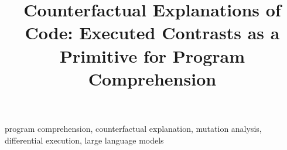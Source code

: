 \documentclass[10pt,conference]{IEEEtran}
\begin{document}
\title{Counterfactual Explanations of Code: Executed Contrasts as a Primitive for Program Comprehension}
\author{}
\maketitle

\begin{IEEEkeywords}
program comprehension, counterfactual explanation, mutation analysis, differential execution, large language models
\end{IEEEkeywords}







{\small
\def\IEEEbibitemsep{1.2pt plus .5pt}

}
\end{document}
